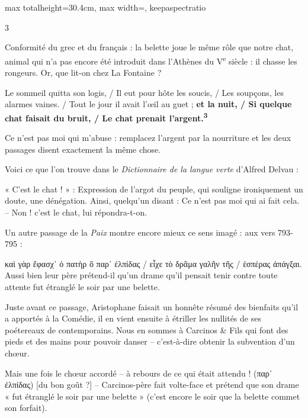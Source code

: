 \documentclass[11pt,twoside]{book}
\newcommand{\italique}[1]{\textit{#1}}
\newcommand{\citComm}[1]{\begin{quoting}[vskip=0.4pt,leftmargin=0.7em,rightmargin=0.2em]#1\end{quoting}}
\newcommand{\nieme}[1]{#1\textsuperscript{e}}
\newcommand{\marqueur}[1]{\textsuperscript{\color{rubricRed}\textbf{#1}}}
\begin{document}
\begin{adjustbox}{max totalheight=30.4cm, max width=\textwidth, keepaspectratio}
\begin{minipage}{\textwidth}
{\begin{multicols}{3}
\par\vspace{1.5pt}
\noindent Conformité du grec et du français : la belette joue le même rôle que notre chat, animal qui n'a pas encore été introduit dans l'Athènes du \nieme{V} siècle : il chasse les rongeurs. Or, que lit-on chez La Fontaine ?
\citComm{Le sommeil quitta son logis, /
Il eut pour hôte les soucis, /
Les soupçons, les alarmes vaines. / 
Tout le jour il avait l'œil au guet ; \textbf{et la nuit, /
Si quelque chat faisait du bruit, /
Le chat prenait l'argent.}\marqueur{3}}
\par\vspace{1.5pt}
\noindent Ce n'est pas moi qui m'abuse : remplacez l'argent par la nourriture et les deux passages disent exactement la même chose.
\par\vspace{1.5pt}
\noindent Voici ce que l'on trouve dans le \italique{Dictionnaire de la langue verte} d'Alfred Delvau :
\citComm{« C'est le chat ! » : Expression de l'argot du peuple, qui souligne ironiquement un doute, une dénégation. Ainsi, quelqu'un disant : Ce n'est pas moi qui ai fait cela. – Non ! c'est le chat, lui répondra-t-on.}
\par\vspace{1.5pt}
\noindent Un autre passage de la \italique{Paix} montre encore mieux ce sens imagé : aux vers 793-795 :
\citComm{καὶ γὰρ ἔφασχ᾽ ὁ πατὴρ ὃ παρ᾽ ἐλπίδας /
εἶχε τὸ δρᾶμα γαλῆν τῆς /
ἑσπέρας ἀπάγξαι.\\
Aussi bien leur père prétend-il qu'un drame qu'il pensait tenir contre toute attente fut étranglé le soir par une belette.}
\par\vspace{1.5pt}
\noindent Juste avant ce passage, Aristophane faisait un honnête résumé des bienfaits qu'il a apportés à la Comédie, il en vient ensuite à étriller les nullités de ses poétereaux de contemporains. Nous en sommes à Carcinos \& Fils qui font des pieds et des mains pour pouvoir danser – c'est-à-dire obtenir la subvention d'un chœur.
\par\vspace{1.5pt}
\noindent Mais une fois le chœur accordé – à rebours de ce qui était attendu ! (παρ᾽ ἐλπίδας) [du bon goût ?] – Carcinos-père fait volte-face et prétend que son drame « fut étranglé le soir par une belette » (c'est encore le soir que la belette commet son forfait).
\par\end{multicols}}
\end{minipage}\end{adjustbox}
\end{document}
